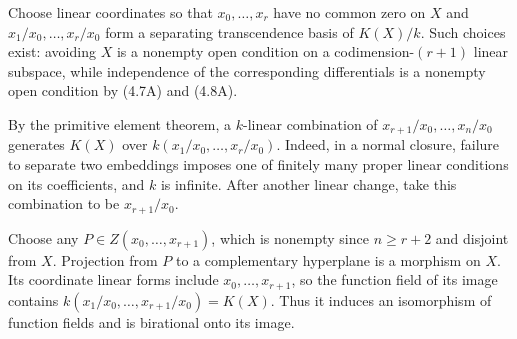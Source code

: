 Choose linear coordinates so that $x_0,\ldots,x_r$ have no common zero on $X$ and $x_1/x_0,\ldots,x_r/x_0$ form a separating transcendence basis of $K(X)/k$. Such choices exist: avoiding $X$ is a nonempty open condition on a codimension-$(r+1)$ linear subspace, while independence of the corresponding differentials is a nonempty open condition by (4.7A) and (4.8A).

By the primitive element theorem, a $k$-linear combination of $x_{r+1}/x_0,\ldots,x_n/x_0$ generates $K(X)$ over $k(x_1/x_0,\ldots,x_r/x_0)$. Indeed, in a normal closure, failure to separate two embeddings imposes one of finitely many proper linear conditions on its coefficients, and $k$ is infinite. After another linear change, take this combination to be $x_{r+1}/x_0$.

Choose any $P\in Z(x_0,\ldots,x_{r+1})$, which is nonempty since $n\ge r+2$ and disjoint from $X$. Projection from $P$ to a complementary hyperplane is a morphism on $X$. Its coordinate linear forms include $x_0,\ldots,x_{r+1}$, so the function field of its image contains $k(x_1/x_0,\ldots,x_{r+1}/x_0)=K(X)$. Thus it induces an isomorphism of function fields and is birational onto its image.
